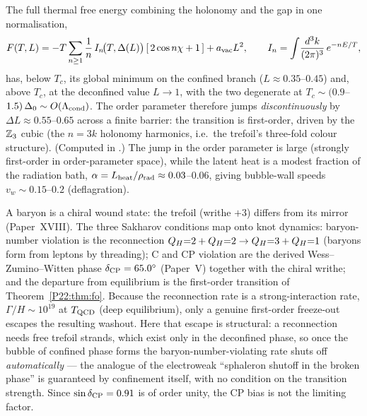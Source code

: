 \begin{theorem}
\label{P22:thm:fo}
The full thermal free energy combining the holonomy and the gap in one
normalisation,
\begin{equation}
  F(T,L)=-T\sum_{n\ge1}\frac1n\,I_n\!\big(T,\Delta(L)\big)\,[\,2\cos n\chi+1\,]+a_{\rm vac}L^2,
  \qquad I_n=\int\!\frac{d^3k}{(2\pi)^3}\,e^{-nE/T},
  \label{P22:eq:FTL}
\end{equation}
has, below $T_c$, its global minimum on the confined branch
($L\!\approx\!0.35$--$0.45$) and, above $T_c$, at the deconfined value
$L\!\to\!1$, with the two degenerate at $T_c\sim(0.9$--$1.5)\,\Delta_0
\sim O(\Lambda_{\mathrm{cond}})$. The order parameter therefore jumps
\emph{discontinuously} by $\Delta L\approx0.55$--$0.65$ across a finite
barrier: the transition is first-order, driven by the $\mathbb{Z}_3$ cubic
(the $n=3k$ holonomy harmonics, i.e.\ the trefoil's three-fold colour
structure). (Computed in .) The jump
in the order parameter is large (strongly first-order in
order-parameter space), while the latent heat is a modest fraction of
the radiation bath, $\alpha=L_{\rm heat}/\rho_{\rm rad}\approx0.03$--$0.06$,
giving bubble-wall speeds $v_w\sim0.15$--$0.2$ (deflagration).
\end{theorem}

A baryon is a chiral wound state: the trefoil (writhe $+3$) differs
from its mirror (Paper~XVIII). The three Sakharov conditions map onto
knot dynamics: baryon-number violation is the reconnection
$Q_H{=}2+Q_H{=}2\to Q_H{=}3+Q_H{=}1$ (baryons form from leptons by
threading); C and CP violation are the derived Wess--Zumino--Witten
phase $\delta_{\rm CP}=65.0^\circ$ (Paper~V) together with the chiral
writhe; and the departure from equilibrium is the first-order
transition of Theorem~\ref{P22:thm:fo}. Because the reconnection rate
is a strong-interaction rate, $\Gamma/H\sim10^{19}$ at $T_{\rm QCD}$
(deep equilibrium), only a genuine first-order freeze-out escapes the
resulting washout. Here that escape is structural: a reconnection needs
free trefoil strands, which exist only in the deconfined phase, so once
the bubble of confined phase forms the baryon-number-violating rate
shuts off \emph{automatically} --- the analogue of the electroweak
``sphaleron shutoff in the broken phase'' is guaranteed by confinement
itself, with no condition on the transition strength. Since
$\sin\delta_{\rm CP}=0.91$ is of order unity, the CP bias is not the
limiting factor.

